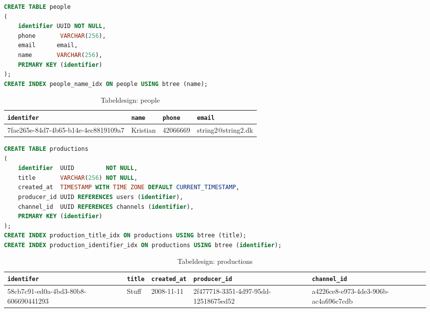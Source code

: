 
\begin{lstlisting}[language=sql, caption=people.sql]
CREATE TABLE people
(
    identifier UUID NOT NULL,
    phone       VARCHAR(256),
    email      email,
    name       VARCHAR(256),
    PRIMARY KEY (identifier)
);
CREATE INDEX people_name_idx ON people USING btree (name);
\end{lstlisting}



\begin{table}[ht]
    \begin{tabularx}{\textwidth}{|X|X|X|X|}
        \hline
        \texttt{\textbf{identifer}} &  \texttt{\textbf{name}} & \texttt{\textbf{phone}} & \texttt{\textbf{email}}\\
        \hline
        7fae265e-84d7-4b65-b14e-4ec8819109a7 & Kristian & 42066669 & string2@string2.dk\\
        \hline
    \end{tabularx}
    \caption{Tabeldesign: people}
    \label{tab:people_table}
\end{table}



\begin{lstlisting}[language=sql, caption=productions.sql]
CREATE TABLE productions
(
    identifier  UUID         NOT NULL,
    title       VARCHAR(256) NOT NULL,
    created_at  TIMESTAMP WITH TIME ZONE DEFAULT CURRENT_TIMESTAMP,
    producer_id UUID REFERENCES users (identifier),
    channel_id  UUID REFERENCES channels (identifier),
    PRIMARY KEY (identifier)
);
CREATE INDEX production_title_idx ON productions USING btree (title);
CREATE INDEX production_identifier_idx ON productions USING btree (identifier);
\end{lstlisting}

\begin{table}[ht]
    \begin{tabularx}{\textwidth}{|X|X|X|X|X|}
        \hline
        \texttt{\textbf{identifer}} &  \texttt{\textbf{title}} & \texttt{\textbf{created\_at}} & \texttt{\textbf{producer\_id}} & \texttt{\textbf{channel\_id}}\\
        \hline
        58cb7c91-ed0a-4bd3-80b8-606690441293 & Stuff & 2008-11-11 & 2f477718-3351-4d97-95dd-12518675ed52 &  a4226ce8-e973-4de3-906b-ac4a696c7cdb\\
        \hline
    \end{tabularx}
    \caption{Tabeldesign: productions}
    \label{tab:productions_table}
\end{table}


